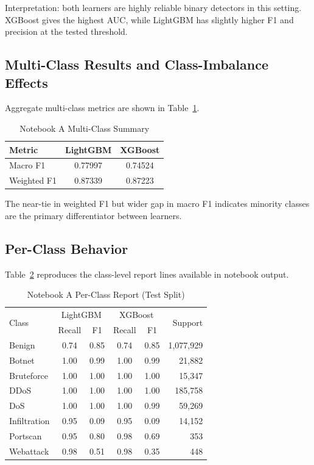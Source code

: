 \documentclass[10pt,journal]{IEEEtran}
\begin{document}
Interpretation: both learners are highly reliable binary detectors in this setting. XGBoost gives the highest AUC, while LightGBM has slightly higher F1 and precision at the tested threshold.

\subsection{Multi-Class Results and Class-Imbalance Effects}
Aggregate multi-class metrics are shown in Table~\ref{tab:gb_multi}.

\begin{table}[!t]
\caption{Notebook A Multi-Class Summary}
\label{tab:gb_multi}
\centering
\begin{tabular}{lcc}
\toprule
Metric & LightGBM & XGBoost \\
\midrule
Macro F1 & 0.77997 & 0.74524 \\
Weighted F1 & 0.87339 & 0.87223 \\
\bottomrule
\end{tabular}
\end{table}

The near-tie in weighted F1 but wider gap in macro F1 indicates minority classes are the primary differentiator between learners.

\subsection{Per-Class Behavior}
Table~\ref{tab:gb_perclass} reproduces the class-level report lines available in notebook output.

\begin{table}[!t]
\caption{Notebook A Per-Class Report (Test Split)}
\label{tab:gb_perclass}
\centering
\begin{tabular}{l c c c c r}
\toprule
\multirow{2}{*}{Class} & \multicolumn{2}{c}{LightGBM} & \multicolumn{2}{c}{XGBoost} & \multirow{2}{*}{Support} \\
 & Recall & F1 & Recall & F1 & \\
\midrule
Benign & 0.74 & 0.85 & 0.74 & 0.85 & 1,077,929 \\
Botnet & 1.00 & 0.99 & 1.00 & 0.99 & 21,882 \\
Bruteforce & 1.00 & 1.00 & 1.00 & 1.00 & 15,347 \\
DDoS & 1.00 & 1.00 & 1.00 & 1.00 & 185,758 \\
DoS & 1.00 & 1.00 & 1.00 & 0.99 & 59,269 \\
Infiltration & 0.95 & 0.09 & 0.95 & 0.09 & 14,152 \\
Portscan & 0.95 & 0.80 & 0.98 & 0.69 & 353 \\
Webattack & 0.98 & 0.51 & 0.98 & 0.35 & 448 \\
\bottomrule
\end{tabular}
\end{table}
\end{document}
